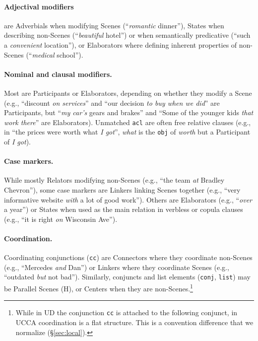 \documentclass[11pt,a4paper,table]{article}
\begin{document}
\paragraph{Adjectival modifiers} are Adverbials when modifying Scenes
    (``\textit{romantic} dinner''), States when describing non-Scenes (``\textit{beautiful} hotel'') 
    or when semantically predicative (``such a \textit{convenient} location''), or
    Elaborators where defining inherent properties of non-Scenes (``\textit{medical} school'').

\paragraph{Nominal and clausal modifiers.}
    Most are Participants or Elaborators,
    depending on whether they modify a Scene (e.g.,
    ``discount \textit{on services}'' and
    ``our decision \textit{to buy when we did}'' are Participants,
    but ``\textit{my car's} gears and brakes'' and ``Some of the younger kids \textit{that work there}'' are Elaborators).
    Unmatched \texttt{acl} are often
    free relative clauses (e.g., in ``the prices were worth what \textit{I got}'',
    \textit{what} is the \texttt{obj} of \textit{worth} but
    a Participant of \textit{I got}).

\paragraph{Case markers.}
      While mostly Relators
      modifying non-Scenes (e.g., ``the team \textit{at} Bradley Chevron''),
      some case markers are Linkers linking Scenes together 
      (e.g., ``very informative website \textit{with} a lot of good work'').
      Others are Elaborators (e.g., ``\textit{over} a year'') or States
      when used as the main relation in verbless or copula clauses
      (e.g., ``it is right \textit{on} Wisconsin Ave'').
    
\paragraph{Coordination.}
      Coordinating conjunctions (\texttt{cc}) are Connectors where they coordinate non-Scenes
      (e.g., ``Mercedes \textit{and} Dan'')
      or Linkers where they coordinate Scenes (e.g., ``outdated \textit{but} not bad'').
      Similarly, conjuncts and list elements (\texttt{conj}, \texttt{list}) may be Parallel Scenes (H),
      or Centers when they are non-Scenes.\footnote{While in UD 
      the conjunction \texttt{cc} is attached to the following conjunct,
      in UCCA coordination is a flat structure.
      This is a convention difference that we normalize (\S\ref{sec:local}).}
\end{document}
